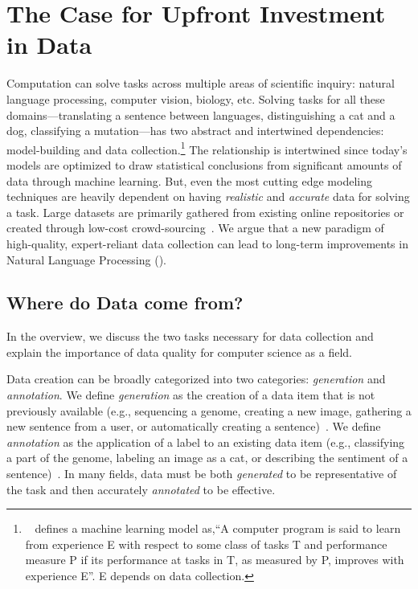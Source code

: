 \chapter{The Case for Upfront Investment in Data}
\label{sec:intro}

Computation can solve tasks across multiple areas of scientific inquiry: natural language processing, computer vision, biology, etc.  
%
Solving tasks for all these domains---translating a sentence between languages, distinguishing a cat and a dog, classifying a mutation---has two abstract and intertwined dependencies: model-building and data collection.\footnote{~\citet{mitchell1997introduction} defines a machine learning model as,``A computer program is said to learn from experience E with respect to some class of tasks T and performance measure P if its performance at tasks in T, as measured by P, improves with experience E''.  E depends on data collection.}
%
The relationship is intertwined since today's models are optimized to draw statistical conclusions from significant amounts of data through machine learning.  
%
But, even the most cutting edge modeling techniques are heavily dependent on having \textit{realistic} and \textit{accurate} data for solving a task.
%
Large datasets are primarily gathered from existing online repositories or created through low-cost crowd-sourcing~\citep{deng2009imagenet,rajpurkar-16,budzianowski2018multiwoz}.
%
We argue that a new paradigm of high-quality, expert-reliant data collection can lead to long-term improvements in Natural Language Processing (\nlp{}).


\section{Where do Data come from?}

In the overview, we discuss the two tasks necessary for data collection and explain the importance of data quality for computer science as a field.  

Data creation can be broadly categorized into two categories: \textit{generation} and \textit{annotation}.  
%
We define \textit{generation} as the creation of a data item that is not previously available (e.g., sequencing a genome, creating a new image, gathering a new sentence from a user, or automatically creating a sentence)~\citep{atkins1992corpus,goodfellow2014generative,zhu2018texygen}.
%
We define \textit{annotation} as the application of a label to an existing data item (e.g., classifying a part of the genome, labeling an image as a cat, or describing the sentiment of a sentence)~\citep{deng2009imagenet,Finin2010AnnotatingNE,kozomara2014mirbase}.
%
In many fields, data must be both \textit{generated} to be representative of the task and then accurately \textit{annotated} to be effective.

